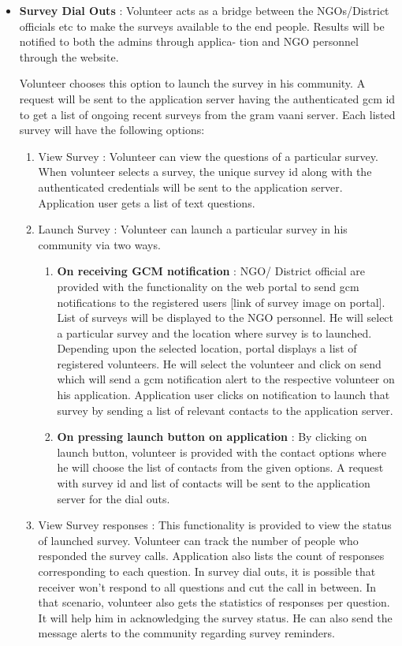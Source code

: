 \begin{itemize}
\item \textbf{Survey Dial Outs} : Volunteer acts as a bridge between the
NGOs/District officials etc to make the surveys available to the end
people. Results will be notified to both the admins through applica-
tion and NGO personnel through the website.

Volunteer  chooses this option to launch the survey in his community. A request will be sent to the application server having the authenticated gcm id to get a list of ongoing recent surveys from the gram vaani server. Each listed survey will have the following options:
	\begin{enumerate}
	\item{ View Survey} : Volunteer can view the questions of a particular survey. When volunteer selects a survey, the unique survey id along with the authenticated credentials will be sent to the application server.  Application user gets a list of text questions.

	\item{Launch Survey} :  Volunteer can launch a particular survey in his community via two ways.
	
		\begin{enumerate}
	\item\textbf{On receiving GCM notification} : NGO/ District official are provided with the functionality on the web portal to send gcm notifications to the registered users [link of survey image on portal]. List of surveys will be displayed to the NGO personnel. He will select a particular survey and the location where survey is to launched. Depending upon the selected location, portal displays a list of registered volunteers. He will select the volunteer and click on send which will send a gcm notification alert to the respective volunteer on his application. Application user clicks on notification to launch that survey by sending a list of relevant contacts to the application server.


\item\textbf{On pressing launch button on application} : By clicking on launch button, volunteer is provided with the contact options where he will choose the list of contacts from the given options. A request with survey id and list of contacts  will be sent to the application server for the dial outs.
	\end{enumerate}


\item {View Survey responses} :  This functionality is provided to view the status of launched survey. Volunteer can track the number of people who responded the survey calls. Application also lists the count of responses corresponding to each question. In survey dial outs, it is possible that receiver won’t respond to all questions and cut the call in between.  In that scenario, volunteer also gets the statistics of responses per question. It will help him in acknowledging the survey status. He can also send the message alerts to the community regarding survey reminders.
\end{enumerate}


\end{itemize}
